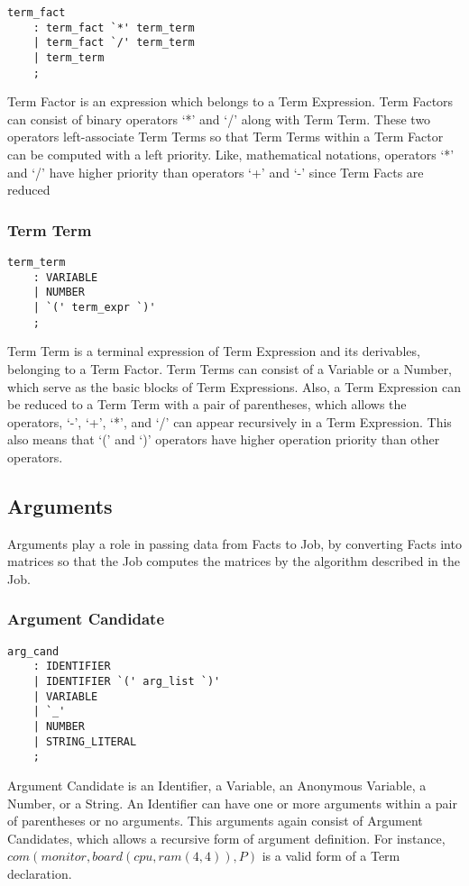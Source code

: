 \documentclass[prodmode,acmtecs]{acmsmall}
\begin{document}
\begin{lstlisting}
term_fact
	: term_fact `*' term_term
	| term_fact `/' term_term
	| term_term
	;
\end{lstlisting}

Term Factor is an expression which belongs to a Term Expression.  Term 
Factors can consist of binary operators `*' and `/' along with Term
Term.  These two operators left-associate Term Terms so that Term
Terms within a Term Factor can be computed with a left priority. Like,
mathematical notations, operators `*' and `/' have higher priority than
operators `+' and `-' since Term Facts are reduced 


\subsubsection{Term Term}
\begin{lstlisting}
term_term
	: VARIABLE
	| NUMBER
	| `(' term_expr `)'
	;
\end{lstlisting}

Term Term is a terminal expression of Term Expression and its derivables,
belonging to a Term Factor.  Term Terms can consist of a Variable or a
Number, which serve as the basic blocks of Term Expressions.  Also, a Term
Expression can be reduced to a Term Term with a pair of parentheses, which
allows the operators, `-', `+', `*', and `/' can appear recursively in a
Term Expression.  This also means that `(' and `)' operators have higher
operation priority than other operators.

\subsection{Arguments}
Arguments play a role in passing data from Facts to Job, by converting Facts
into matrices so that the Job computes the matrices by the algorithm
described in the Job.

\subsubsection{Argument Candidate}
\begin{lstlisting}
arg_cand
	: IDENTIFIER
	| IDENTIFIER `(' arg_list `)'
	| VARIABLE
	| `_'
	| NUMBER
	| STRING_LITERAL
	;
\end{lstlisting}

Argument Candidate is an Identifier, a Variable, an Anonymous
Variable, a Number, or a String.  An Identifier can have one
or more arguments within a pair of parentheses or no arguments.
This arguments again consist of Argument Candidates, which
allows a recursive form of argument definition.  For instance, 
$com(monitor, board(cpu, ram(4, 4)), P)$ is a valid form
of a Term declaration.
\end{document}
